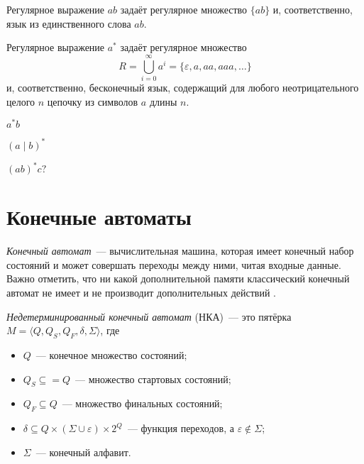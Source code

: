 \begin{example}
    Регулярное выражение $ab$ задаёт регулярное множество $\{ab\}$ и, соответственно, язык из единственного слова $ab$.
\end{example}


\begin{example}
    Регулярное выражение $a^*$ задаёт регулярное множество $$R = \bigcup_{i=0}^{\infty}{a^i} = \{\varepsilon, a, aa, aaa, \ldots \}$$ и, соответственно, бесконечный язык, содержащий для любого неотрицательного целого $n$ цепочку из символов $a$ длины $n$.
\end{example}


\begin{example}
    $a^*b$
\end{example}

\begin{example}
    $(a\mid b)^*$
\end{example}

\begin{example}
    $(ab)^*c?$
\end{example}

\section{Конечные автоматы}

\emph{Конечный автомат}~--- вычислительная машина, которая имеет конечный набор состояний и может совершать переходы между ними, читая входные данные.
Важно отметить, что ни какой дополнительной памяти классический конечный автомат не имеет%
 и не производит дополнительных действий%
.

\begin{definition}
    \label{def:NondeterminicticFiniteAutomata}
    \emph{Недетерминированный конечный автомат} (НКА)~--- это пятёрка $M = \langle Q, Q_S, Q_F, \delta, \Sigma \rangle$, где
    \begin{itemize}
        \item $Q$~--- конечное множество состояний;
        \item $Q_S \subseteq= Q$~--- множество стартовых состояний;
        \item $Q_F \subseteq Q$~--- множество финальных состояний;
        \item $\delta \subseteq Q \times (\Sigma \cup \varepsilon) \times 2^Q$~--- функция переходов, а $\varepsilon \notin \Sigma$;
        \item $\Sigma$~--- конечный алфавит.
    \end{itemize}
\end{definition}

